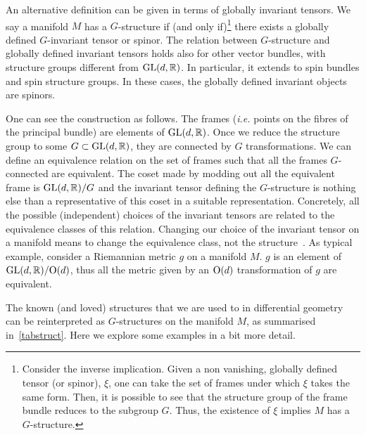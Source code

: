 \documentclass[debug]{phd}
\begin{document}
					An alternative definition can be given in terms of globally invariant tensors.
					We say a manifold $M$ has a $G$-structure if (and only if)\footnote{%
						Consider the inverse implication. 
						Given a non vanishing, globally defined tensor (or spinor), $\xi$, one can take the set of frames under which $\xi$ takes the same form.
						Then, it is possible to see that the structure group of the frame bundle reduces to the subgroup $G$.
						Thus, the existence of $\xi$ implies $M$ has a $G$-structure.%
						}
					there exists a globally defined $G$-invariant tensor or spinor.
					The relation between $G$-structure and globally defined invariant tensors holds also for other vector bundles, with structure groups different from $\mathrm{GL}(d,\mathbb{R})$. 
					In particular, it extends to spin bundles and spin structure groups.
					In these cases, the globally defined invariant objects are spinors.
					
					One can see the construction as follows. 
					The frames (\emph{i.e.} points on the fibres of the principal bundle) are elements of $\mathrm{GL}(d,\mathbb{R})$. 
					Once we reduce the structure group to some $G \subset \mathrm{GL}(d,\mathbb{R})$, they are connected by $G$ transformations.
					We can define an equivalence relation on the set of frames such that all the frames $G$-connected are equivalent.
					The coset made by modding out all the equivalent frame is $\mathrm{GL}(d,\mathbb{R})/G$ and the invariant tensor defining the $G$-structure is nothing else than a representative of this coset in a suitable representation.
					Concretely, all the possible (independent) choices of the invariant tensors are related to the equivalence classes of this relation. 
					Changing our choice of the invariant tensor on a manifold means to change the equivalence class, not the structure~\cite{liegroupstruc}.
					As typical example, consider a Riemannian metric $g$ on a manifold $M$.
					$g$ is an element of $\mathrm{GL}(d,\mathbb{R})/\mathrm{O}(d)$, thus all the metric given by an $\mathrm{O}(d)$ transformation of $g$ are equivalent.
					
					The known (and loved) structures that we are used to in differential geometry can be reinterpreted as $G$-structures on the manifold $M$, as summarised in~\cref{tabstruct}.
					Here we explore some examples in a bit more detail.
					
\end{document}
